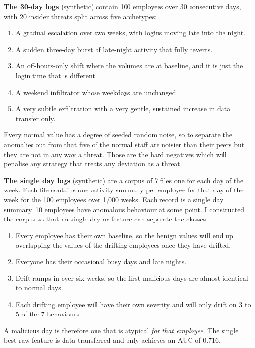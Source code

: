 \documentclass[a4paper,12pt]{article}
\newcommand{\resultinput}[1]{{\let\small\footnotesize\setlength{\tabcolsep}{4pt}}}
\begin{document}
\resultinput{tables/datasets}

\textbf{The 30-day logs} (synthetic) contain 100 employees over 30 consecutive days, with 20 insider threats split across five archetypes:

\begin{enumerate}
  \item A gradual escalation over two weeks, with logins moving late into the night.
  \item A sudden three-day burst of late-night activity that fully reverts.
  \item An off-hours-only shift where the volumes are at baseline, and it is just the login time that is different.
  \item A weekend infiltrator whose weekdays are unchanged.
  \item A very subtle exfiltration with a very gentle, sustained increase in data transfer only.
\end{enumerate}
Every normal value has a degree of seeded random noise, so to separate the anomalies out from that five of the normal staff are noisier than their peers but they are not in any way a threat. Those are the hard negatives which will penalise any strategy that treats any deviation as a threat.

\textbf{The single day logs} (synthetic) are a corpus of 7 files one for each day of the week. Each file contains one activity summary per employee for that day of the week for the 100 employees over 1,000 weeks. Each record is a single day summary. 10 employees have anomalous behaviour at some point. I constructed the corpus so that no single day or feature can separate the classes.

\begin{enumerate}
  \item Every employee has their own baseline, so the benign values will end up overlapping the values of the drifting employees once they have drifted.
  \item Everyone has their occasional busy days and late nights.
  \item Drift ramps in over six weeks, so the first malicious days are almost identical to normal days.
  \item Each drifting employee will have their own severity and will only drift on 3 to 5 of the 7 behaviours.
\end{enumerate}
A malicious day is therefore one that is atypical \emph{for that employee}. The single best raw feature is data transferred and only achieves an AUC of 0.716.
\end{document}
